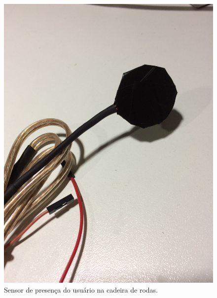 \begin{figure}[h!]
    \begin{center}
        \includegraphics[scale=0.05]{figuras/fall_circ.jpg}
    \end{center}
    \caption{Sensor de presença do usuário na cadeira de rodas.}
    \label{fig:fall_ele}
\end{figure}


